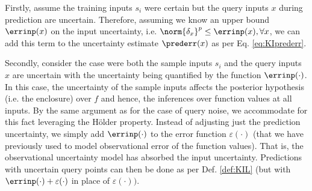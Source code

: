 Firstly, assume the training inputs $s_i$ were certain but the query inputs $x$ during prediction are uncertain.
Therefore, assuming we know an upper bound $\errinp(x)$ on the input uncertainty, i.e. 
$\norm{\delta_x}^p\leq \errinp(x), \forall x$, we can add this term to the uncertainty estimate $\prederr(x)$ as per Eq. \ref{eq:KIprederr}.

Secondly, consider the case were both the sample inputs $s_i$ and the query inputs $x$ are uncertain with the uncertainty being quantified by the function $\errinp(\cdot)$. In this case, the uncertainty of the sample inputs
 affects the posterior hypothesis (i.e. the enclosure) over $f$ and hence, the inferences over function values at all inputs. 
By the same argument as for the case of query noise, we accommodate for this fact leveraging the H\"older property. Instead of adjusting just the prediction uncertainty, we simply add $ \errinp(\cdot)$ to the error function $\varepsilon(\cdot)$ (that we have previously used to model observational 
error of the function values). That is, the observational uncertainty model has absorbed the input uncertainty.  Predictions with uncertain query points can then be done as per Def. \ref{def:KIL} (but with $ \errinp(\cdot)+ \varepsilon(\cdot)$ in place of $\varepsilon(\cdot) )$.